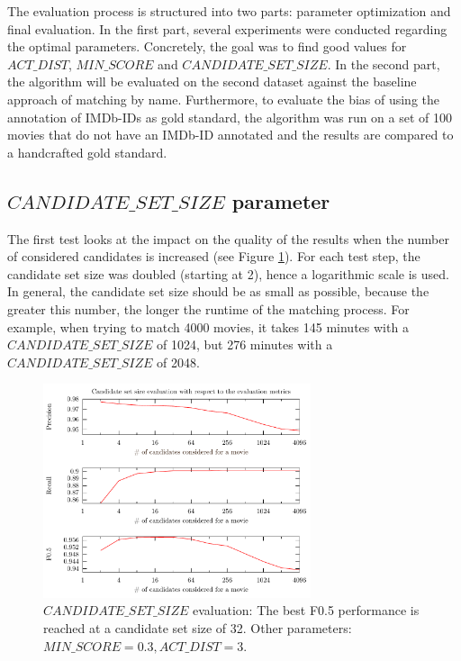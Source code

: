 The evaluation process is structured into two parts: parameter optimization and final evaluation.
In the first part, several experiments were conducted regarding the optimal parameters.
Concretely, the goal was to find good values for $ACT\_DIST$, $MIN\_SCORE$ and $CANDIDATE\_SET\_SIZE$.
In the second part, the algorithm will be evaluated on the second dataset against the baseline approach of matching by name.
Furthermore, to evaluate the bias of using the annotation of IMDb-IDs as gold standard, the algorithm was run on a set of 100 movies that do not have an IMDb-ID annotated and the results are compared to a handcrafted gold standard.

\subsection{$CANDIDATE\_SET\_SIZE$ parameter}
The first test looks at the impact on the quality of the results when the number of considered candidates is increased (see Figure \ref{fig_candidate_set_size}).
For each test step, the candidate set size was doubled (starting at 2), hence a logarithmic scale is used.
In general, the candidate set size should be as small as possible, because the greater this number, the longer the runtime of the matching process.
For example, when trying to match 4000 movies, it takes 145 minutes with a $CANDIDATE\_SET\_SIZE$ of 1024, but 276 minutes with a $CANDIDATE\_SET\_SIZE$ of 2048.

\begin{figure}[h!]
  \begin{center}
  \includegraphics[width=0.7\textwidth]{images/candidateSetSize.pdf}
  \end{center}
  \caption{$CANDIDATE\_SET\_SIZE$ evaluation: The best F0.5 performance is reached at a candidate set size of 32. Other parameters: $MIN\_SCORE = 0.3, ACT\_DIST = 3$.}
  \label{fig_candidate_set_size}
\end{figure}

